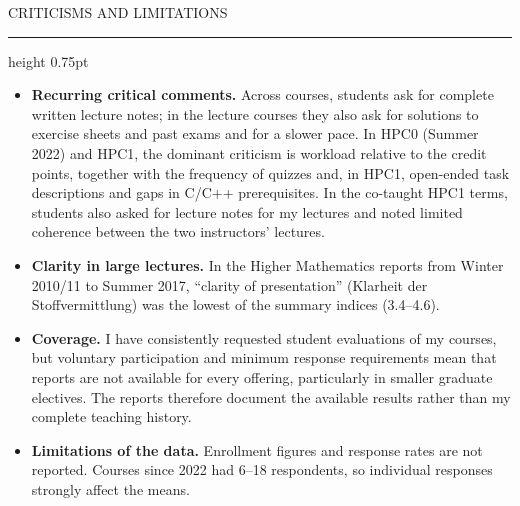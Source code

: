 \documentclass[10pt]{article}
\newcommand{\headsize}{\fontsize{10.5pt}{12.8pt}\selectfont}
\newcommand{\cvsection}[1]{%
  \par\vspace{9pt}%
  {\headsize\bfseries\color{heading}\strut#1\par}%
  \nopagebreak\vspace{1pt}%
  {\color{rule}\hrule height 0.75pt}%
  \nopagebreak\vspace{3pt}%
  \prevdepth=2.7pt\relax
}
\newenvironment{cvitems}
  {\begin{itemize}[label=•, leftmargin=15pt, labelwidth=10pt, labelsep=0pt,
                   align=left, topsep=0pt, partopsep=0pt, parsep=0pt,
                   itemsep=2pt, beginpenalty=10000]}
  {\end{itemize}\vspace{3pt}}
\begin{document}
\cvsection{CRITICISMS AND LIMITATIONS}

\begin{cvitems}
  \item \textbf{Recurring critical comments.} Across courses, students ask for complete written lecture notes; in the lecture courses they also ask for solutions to exercise sheets and past exams and for a slower pace. In HPC0 (Summer 2022) and HPC1, the dominant criticism is workload relative to the credit points, together with the frequency of quizzes and, in HPC1, open-ended task descriptions and gaps in C/C++ prerequisites. In the co-taught HPC1 terms, students also asked for lecture notes for my lectures and noted limited coherence between the two instructors' lectures.
  \item \textbf{Clarity in large lectures.} In the Higher Mathematics reports from Winter 2010/11 to Summer 2017, “clarity of presentation” (Klarheit der Stoffvermittlung) was the lowest of the summary indices (3.4–4.6).
  \item \textbf{Coverage.} I have consistently requested student evaluations of my courses, but voluntary participation and minimum response requirements mean that reports are not available for every offering, particularly in smaller graduate electives. The reports therefore document the available results rather than my complete teaching history.
  \item \textbf{Limitations of the data.} Enrollment figures and response rates are not reported. Courses since 2022 had 6–18 respondents, so individual responses strongly affect the means.
\end{cvitems}
\end{document}
